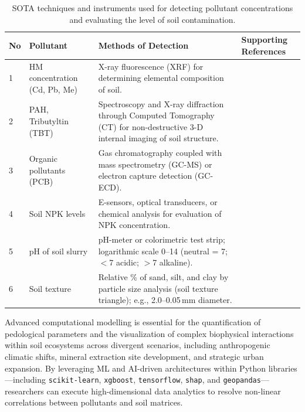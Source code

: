 \documentclass[environments,article,submit,pdftex,moreauthors]{Definitions/mdpi}
\begin{document}
\begin{table}[H]
\caption{SOTA techniques and instruments used for detecting pollutant
    concentrations and evaluating the level of soil
    contamination.\label{tab1}}
\begin{tabularx}{\textwidth}{@{} p{0.8cm} p{2.2cm} p{5.5cm} X @{}}
\toprule
\textbf{No} & \textbf{Pollutant} & \textbf{Methods of Detection}
    & \textbf{Supporting References} \\
\midrule
1 & HM concentration (Cd, Pb, Me)
    & X-ray fluorescence (XRF) for determining elemental composition of
      soil.
    & \cite{Lu2023,LindhLemenkova2023b,Wan2019,Mukhopadhyay2020,Adewumi2024,Hu2020,Li2019} \\[4pt]
2 & PAH, Tributyltin (TBT)
    & Spectroscopy and X-ray diffraction through Computed Tomography (CT)
      for non-destructive 3-D internal imaging of soil structure.
    & \cite{LindhLemenkova2022d,Deceuster2012,Racic2025,LindhLemenkova2022a,Xu2026,Stojic2019} \\[4pt]
3 & Organic pollutants (PCB)
    & Gas chromatography coupled with mass spectrometry (GC-MS) or
      electron capture detection (GC-ECD).
    & \cite{Bustamante2025,Anagnostou2025,Sandu2025,Shen2024,Appel2022,Arnesdotter2025} \\[4pt]
4 & Soil NPK levels
    & E-sensors, optical transducers, or chemical analysis for evaluation
      of NPK concentration.
    & \cite{Hossain2024,Pal2024,Ma2024,Guan2024,Atoloye2024,Luo2017} \\[4pt]
5 & pH of soil slurry
    & pH-meter or colorimetric test strip; logarithmic scale 0--14
      (neutral = 7; $<$7 acidic; $>$7 alkaline).
    & \cite{Zireeni2023,LindhLemenkova2022b,Hepperly2009,LindhLemenkova2023c,Guo2021} \\[4pt]
6 & Soil texture
    & Relative \% of sand, silt, and clay by particle size analysis (soil
      texture triangle); e.g., 2.0--0.05\,mm diameter.
    & \cite{Polakowski2023,LindhLemenkova2023d,Mozaffari2026,LindhLemenkova2023a,LindhLemenkova2023e,Jing2023,Wang2022} \\
\bottomrule
\end{tabularx}
\end{table}

Advanced computational modelling is essential for the quantification of
pedological parameters and the visualization of complex biophysical
interactions within soil ecosystems across divergent scenarios, including
anthropogenic climatic shifts, mineral extraction site development, and
strategic urban expansion. By leveraging ML and AI-driven architectures within
Python libraries---including \texttt{scikit-learn}, \texttt{xgboost},
\texttt{tensorflow}, \texttt{shap}, and \texttt{geopandas}---researchers can
execute high-dimensional data analytics to resolve non-linear correlations
between pollutants and soil matrices.
\end{document}
